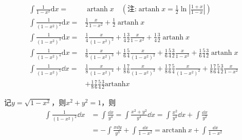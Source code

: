 \begin{theorem}[平方差分母型]
\vspace{-15pt}
\begin{align*}
\int\frac{1}{1-x^2}\mathrm{d}x=&\operatorname{artanh}x\quad(\text{注:}\operatorname{artanh}x=\frac{1}{2}\ln\left|\frac{1+x}{1-x}\right|)\\
\int\frac{1}{\left(1-x^2\right)^2}\mathrm{d}x=&\frac{1}{2}\frac{x}{1-x^2}+\frac{1}{2}\operatorname{artanh}x\\
\int\frac{1}{\left(1-x^2\right)^3}\mathrm{d}x=&\frac{1}{4}\frac{x}{\left(1-x^2\right)^2}+\frac{1}{4}\frac{3}{2}\frac{x}{1-x^2}+\frac{1}{4}\frac{3}{2}\operatorname{artanh}x\\
\int\frac{1}{(1-x^{2})^{4}}\mathrm{d}x=&\frac{1}{6}\frac{x}{(1-x^2)^3}+\frac{1}{6}\frac{5}{4}\frac{x}{(1-x^2)^2}+\frac{1}{6}\frac{5}{4}\frac{3}{2}\frac{x}{1-x^2}+\frac{1}{6}\frac{5}{4}\frac{3}{2}\operatorname{artanh}x\\
\int\frac{1}{\left(1-x^{2}\right)^{5}}\dd x=&\frac{1}{8}\frac{x}{\left(1-x^{2}\right)^{4}}+\frac{1}{8}\frac{7}{6}\frac{x}{\left(1-x^{2}\right)^{3}}+\frac{1}{8}\frac{7}{6}\frac{5}{4}\frac{x}{\left(1-x^{2}\right)^{2}}+\frac{1}{8}\frac{7}{6}\frac{5}{4}\frac{3}{2}\frac{x}{1-x^{2}}\\
&+\frac{1}{8}\frac{7}{6}\frac{5}{4}\frac{3}{2}\mathrm{artanh}x\end{align*}
\end{theorem}
记$y=\sqrt{1-x^{2}}$，则$x^2+y^2=1$，则
\begin{align*}
    \int\frac{1}{(1-x^{2})^{2}}\dd x&=\int\frac{\dd x}{y^{4}}=\int\frac{x^{2}+y^{2}}{y^{4}}\dd x=\int\frac{x^{2}}{y^{4}}\dd x+\int\frac{\dd x}{y^{2}}\\
&=-\int\frac{x\dd y}{y^3}+\int\frac{\dd x}{1-x^{2}}=\text{arctanh}~x+\int\frac{\dd x}{1-x^{2}}\\
\end{align*}

